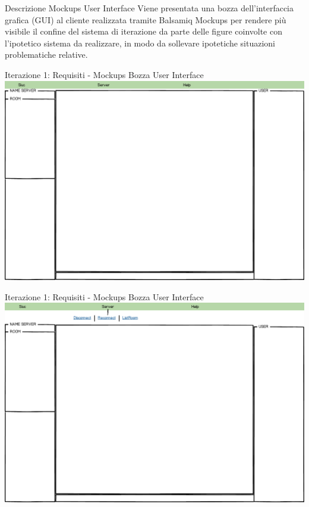 \documentclass[t]{beamer} %
\begin{document}
\begin{frame}{Descrizione Mockups User Interface}
 Viene presentata una bozza dell'interfaccia grafica (GUI) al cliente realizzata tramite Balsamiq Mockups per rendere più visibile 
 il confine del sistema di iterazione da parte delle figure coinvolte con l'ipotetico sistema da realizzare, in modo da sollevare
 ipotetiche situazioni problematiche relative. 
\end{frame} 

\begin{frame} {Iterazione 1: Requisiti - Mockups Bozza User Interface}
    \includegraphics[scale=0.28]{image_mockups/01_snuc_open.png}{\centering}
\end{frame}

\begin{frame} {Iterazione 1: Requisiti - Mockups Bozza User Interface}
    \includegraphics[scale=0.28]{image_mockups/02_snuc_menu_server.png}{\centering}
\end{frame}
\end{document}
